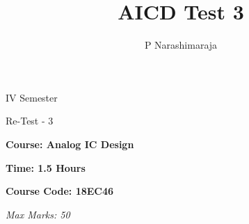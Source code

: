 \documentclass[dvipsnames]{RVexam}
\title{AICD Test 3}
\author{P Narashimaraja }
\newif\ifsee \seefalse
\gdef\courseTitle{Analog IC Design}
\gdef\courseCode{18EC46}
\gdef\sem{IV}
\gdef\testTitle{Re-Test - 3} \fi
\begin{document}
\ifsee{
}\else{
\begin{center}
\sem\; Semester  \par
\testTitle   \par
\end{center}

\begin{minipage}[t]{10cm}
\flushleft
\textbf{Course: \courseTitle}\par
\textbf{Time: 1.5 Hours} \par
\end{minipage}
\hfill
\begin{minipage}[t]{5cm}
\flushright
\textbf{Course Code: \courseCode}\par
\textit{Max Marks: 50}
\end{minipage}
}
\fi
\vspace{0.2cm}
\vspace{2mm}
\end{document}
